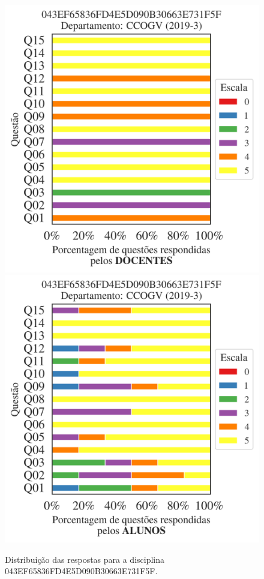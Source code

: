 \documentclass[a4paper,10pt]{article}
\begin{document}
\begin{figure}[h]
\centering
\includegraphics[width=0.485\linewidth]{analise_disciplina_departamento_CCOGV_043EF65836FD4E5D090B30663E731F5F_docentes.png}
\includegraphics[width=0.485\linewidth]{analise_disciplina_departamento_CCOGV_043EF65836FD4E5D090B30663E731F5F_alunos.png}
\caption{\label{fig:analise_geral_departamento}                Distribuição das respostas para a disciplina 043EF65836FD4E5D090B30663E731F5F. }
\end{figure}
\end{document}
